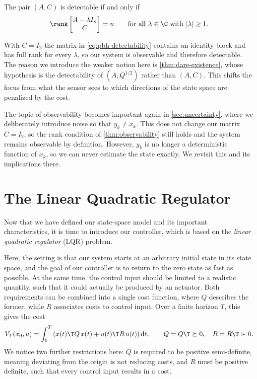 \begin{theorem}
\label{thm:pbh-detectability}
The pair $(A, C)$ is detectable if and only if
\begin{equation}
    \label{eq:pbh-detectability}
    \rank \begin{bmatrix} A - \lambda I_n \\ C \end{bmatrix} = n
    \qquad \text{for all } \lambda \in \C \text{ with } \lvert \lambda \rvert \ge 1 .
\end{equation}
\end{theorem}

With $C = I_2$ the matrix in \eqref{eq:pbh-detectability} contains an identity
block and has full rank for every $\lambda$, so our system is observable and
therefore detectable. The reason we introduce the weaker notion here is
\cref{thm:dare-existence}, whose hypothesis is the detectability of
$(A, Q^{1/2})$ rather than $(A, C)$. This shifts the focus from what
the sensor sees to which directions of the state space are penalized by the
cost.

The topic of observability becomes important again in
\cref{sec:uncertainty}, where we deliberately introduce noise so that
$y_k \neq x_k$. This does not change our matrix $C = I_2$, 
so the rank condition of \cref{thm:observability} still
holds and the system remains observable by definition. However,
$y_k$ is no longer a deterministic function of $x_k$, so we can
never estimate the state exactly. We revisit this and its
implications there.
 
\section{The Linear Quadratic Regulator}
\label{sec:lqr}

Now that we have defined our state-space model and its important
characteristics, it is time to introduce our controller, which is based on the
\emph{linear quadratic regulator} (LQR) problem.

Here, the setting is that our system starts at an arbitrary initial state in its
state space, and the goal of our controller is to return to the zero state as
fast as possible. At the same time, the control input should be limited to a realistic
quantity, such that it could actually be produced by an actuator.
Both requirements can be combined into a single cost function, where $Q$
describes the former, while $R$
associates costs to control input. Over a finite horizon $T$, this gives the
cost~
\begin{equation}
    \label{eq:lqr-cost-finite}
    V_T(x_0, u) = \int_{0}^{T} \left( x(t)\T Q\, x(t) + u(t)\T R\, u(t) \right) \mathrm{d}t ,
    \qquad Q = Q\T \succeq 0, \quad R = R\T \succ 0 .
\end{equation}
We notice two further restrictions here: $Q$ is required to be positive
semi-definite, meaning deviating from the origin is not reducing costs,
and $R$ must be positive definite, such that every control input results in a cost.

